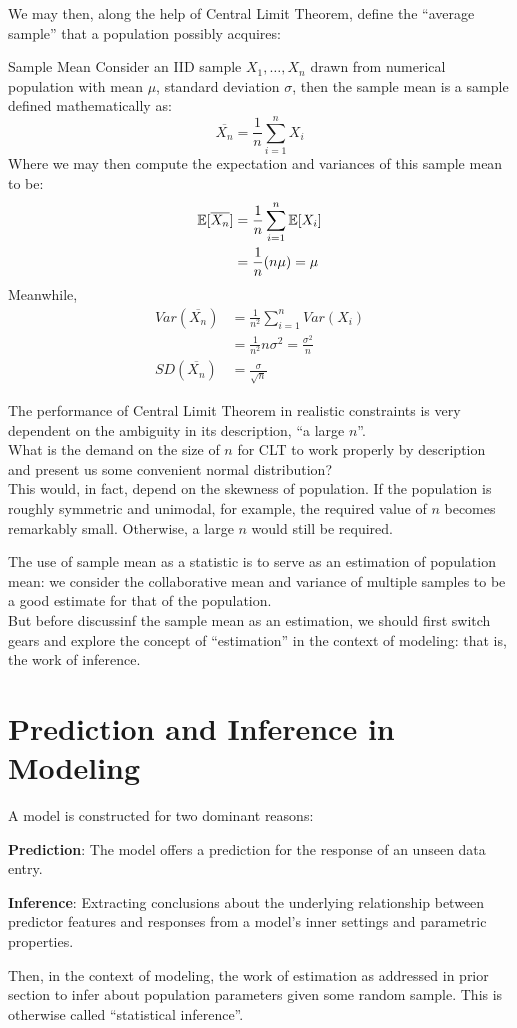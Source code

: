 We may then, along the help of Central Limit Theorem, define the ``average sample'' that a population possibly acquires:
\begin{ln-define}{Sample Mean}{}
    Consider an IID sample $X_1, \dots, X_n$ drawn from numerical population with mean $\mu$, standard deviation $\sigma$, then the sample mean is a sample defined mathematically as:
    \[
        \overline{X_n} = \frac{1}{n} \sum_{i = 1}^n X_i
    \]
    Where we may then compute the expectation and variances of this sample mean to be:
    \begin{align*}
        \mathbb{E}[\overline{X_n}] &= \frac{1}{n} \sum_{i = 1}^n \mathbb{E}[X_i] \\
        &= \frac{1}{n} (n \mu) = \mu
    \end{align*}
    Meanwhile,
    \begin{align*}
        Var(\overline{X_n}) &= \frac{1}{n^2} \sum_{i = 1}^n Var(X_i) \\
        &= \frac{1}{n^2} n \sigma^2 = \frac{\sigma^2}{n} \\
        SD(\overline{X_n}) &= \frac{\sigma}{\sqrt{n}}
    \end{align*}
\end{ln-define}
The performance of Central Limit Theorem in realistic constraints is very dependent on the ambiguity in its description, ``a large $n$''. \\
What is the demand on the size of $n$ for CLT to work properly by description and present us some convenient normal distribution? \\
This would, in fact, depend on the skewness of population. If the population is roughly symmetric and unimodal, for example, the required value of $n$ becomes remarkably small. Otherwise, a large $n$ would still be required.

The use of sample mean as a statistic is to serve as an estimation of population mean: we consider the collaborative mean and variance of multiple samples to be a good estimate for that of the population. \\
But before discussinf the sample mean as an estimation, we should first switch gears and explore the concept of ``estimation'' in the context of modeling: that is, the work of inference.

\section{Prediction and Inference in Modeling}
A model is constructed for two dominant reasons:
\begin{bindenum}
    \item \textbf{Prediction}: The model offers a prediction for the response of an unseen data entry.
    \item \textbf{Inference}: Extracting conclusions about the underlying relationship between predictor features and responses from a model's inner settings and parametric properties.
\end{bindenum}
Then, in the context of modeling, the work of estimation as addressed in prior section to infer about population parameters given some random sample. This is otherwise called ``statistical inference''.


